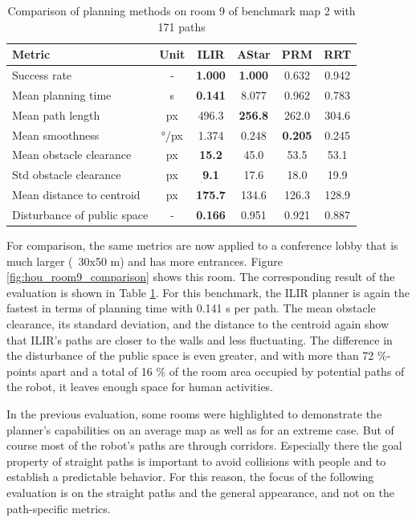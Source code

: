 \begin{table}[h]
\centering
\caption{Comparison of planning methods on room 9 of benchmark map 2 with 171 paths}
\label{tab:room9_results}
\begin{tabular}{lc|cccc}
\hline
\textbf{Metric}                    & \textbf{Unit} & \textbf{ILIR} & \textbf{AStar} & \textbf{PRM} & \textbf{RRT} \\
\hline
Success rate                       & -    & \textbf{1.000}          & \textbf{1.000}         & 0.632          & 0.942 \\
Mean planning time                 & s    & \textbf{0.141} & 8.077         & 0.962          & 0.783 \\
Mean path length                   & px   & 496.3          & \textbf{256.8}& 262.0          & 304.6 \\
Mean smoothness                    & °/px & 1.374          & 0.248         & \textbf{0.205} & 0.245 \\
Mean obstacle clearance            & px   & \textbf{15.2}  & 45.0          & 53.5           & 53.1  \\
Std obstacle clearance             & px   & \textbf{9.1}   & 17.6          & 18.0           & 19.9 \\
Mean distance to centroid          & px   & \textbf{175.7}          & 134.6         & 126.3          & 128.9  \\
Disturbance of public space        & -    & \textbf{0.166} & 0.951         & 0.921          & 0.887 \\
\hline
\end{tabular}
\end{table}

For comparison, the same metrics are now applied to a conference lobby that is much larger (~30x50 m) and has more entrances. Figure \ref{fig:hou_room9_comparison} shows this room. The corresponding result of the evaluation is shown in Table \ref{tab:room9_results}. For this benchmark, the ILIR planner is again the fastest in terms of planning time with 0.141 s per path. The mean obstacle clearance, its standard deviation, and the distance to the centroid again show that ILIR's paths are closer to the walls and less fluctuating. The difference in the disturbance of the public space is even greater, and with more than 72 \%-points apart and a total of 16 \% of the room area occupied by potential paths of the robot, it leaves enough space for human activities.

In the previous evaluation, some rooms were highlighted to demonstrate the planner's capabilities on an average map as well as for an extreme case. But of course most of the robot's paths are through corridors. Especially there the goal property of straight paths is important to avoid collisions with people and to establish a predictable behavior. For this reason, the focus of the following evaluation is on the straight paths and the general appearance, and not on the path-specific metrics. 

